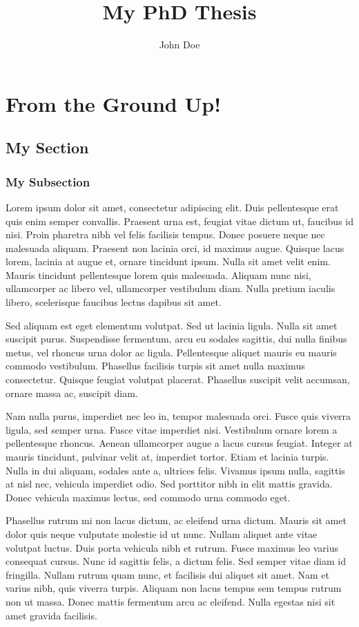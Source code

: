 \documentclass{book}
\title{My PhD Thesis}
\author{John Doe}
\begin{document}

\chapter{From the Ground Up!}
\section{My Section}
\subsection{My Subsection}

Lorem ipsum dolor sit amet, consectetur adipiscing elit. Duis pellentesque erat quis enim semper convallis. Praesent urna est, feugiat vitae dictum ut, faucibus id nisi. Proin pharetra nibh vel felis facilisis tempus. Donec posuere neque nec malesuada aliquam. Praesent non lacinia orci, id maximus augue. Quisque lacus lorem, lacinia at augue et, ornare tincidunt ipsum. Nulla sit amet velit enim. Mauris tincidunt pellentesque lorem quis malesuada. Aliquam nunc nisi, ullamcorper ac libero vel, ullamcorper vestibulum diam. Nulla pretium iaculis libero, scelerisque faucibus lectus dapibus sit amet.

Sed aliquam est eget elementum volutpat. Sed ut lacinia ligula. Nulla sit amet suscipit purus. Suspendisse fermentum, arcu eu sodales sagittis, dui nulla finibus metus, vel rhoncus urna dolor ac ligula. Pellentesque aliquet mauris eu mauris commodo vestibulum. Phasellus facilisis turpis sit amet nulla maximus consectetur. Quisque feugiat volutpat placerat. Phasellus suscipit velit accumsan, ornare massa ac, suscipit diam.

Nam nulla purus, imperdiet nec leo in, tempor malesuada orci. Fusce quis viverra ligula, sed semper urna. Fusce vitae imperdiet nisi. Vestibulum ornare lorem a pellentesque rhoncus. Aenean ullamcorper augue a lacus cursus feugiat. Integer at mauris tincidunt, pulvinar velit at, imperdiet tortor. Etiam et lacinia turpis. Nulla in dui aliquam, sodales ante a, ultrices felis. Vivamus ipsum nulla, sagittis at nisl nec, vehicula imperdiet odio. Sed porttitor nibh in elit mattis gravida. Donec vehicula maximus lectus, sed commodo urna commodo eget.

Phasellus rutrum mi non lacus dictum, ac eleifend urna dictum. Mauris sit amet dolor quis neque vulputate molestie id ut nunc. Nullam aliquet ante vitae volutpat luctus. Duis porta vehicula nibh et rutrum. Fusce maximus leo varius consequat cursus. Nunc id sagittis felis, a dictum felis. Sed semper vitae diam id fringilla. Nullam rutrum quam nunc, et facilisis dui aliquet sit amet. Nam et varius nibh, quis viverra turpis. Aliquam non lacus tempus sem tempus rutrum non ut massa. Donec mattis fermentum arcu ac eleifend. Nulla egestas nisi sit amet gravida facilisis.
\end{document}
